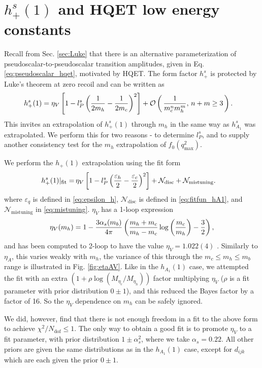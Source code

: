 \section{$h^s_+(1)$ and HQET low energy constants}

Recall from Sec. \ref{sec:Luke} that there is an alternative parameterization of pseudoscalar-to-pseudoscalar transition amplitudes, given in Eq. \eqref{eq:pseudoscalar_hqet}, motivated by HQET. The form factor $h^s_+$ is protected by Luke's theorem at zero recoil and can be written as
\begin{align}
  \label{eq:h+}
  &h^s_+(1) = \eta_V \left[ 1 - l^s_P \left( {1\over 2m_h} - {1\over 2m_c} \right)^2 \right] + \mathcal{O}\left( \, {1\over m_c^n m_h^m}, \, n+m\geq 3 \, \right).
\end{align}
This invites an extrapolation of $h^s_+(1)$ through $m_h$ in the same way as $h_{A_1}^s$ was extrapolated. We perform this for two reasons - to determine $l_P^s$, and to supply another consistency test for the $m_h$ extrapolation of $f_0(q^2_{\text{max}})$.

We perform the $h_+(1)$ extrapolation using the fit form
\begin{align}
  \label{eq:h+_fitform}
  h^s_+(1)|_{\text{fit}} =&\, \eta_V \left[ 1 - l^s_P \left( {\varepsilon_h\over2} - {\varepsilon_c\over 2} \right)^2 \right]
  + \mathcal{N}_{\text{disc}} + \mathcal{N}_{\text{mistuning}}.
\end{align}
where $\varepsilon_q$ is defined in \eqref{eq:epsilon_h}, $\mathcal{N}_{\text{disc}}$ is defined in \eqref{eq:fitfun_hA1}, and $\mathcal{N}_{\text{mistuning}}$ in \eqref{eq:mistuning}. $\eta_V$ has a 1-loop expression \cite{PASCHALIS1983473}
\begin{align}
  \eta_V(m_h) = 1 - {3 \alpha_s(m_b) \over 4\pi} \left( {m_h+m_c\over m_h-m_c} \log\left({m_c\over m_h}\right) - {3\over 2} \right),
\end{align}
and has been computed to 2-loop to have the value $\eta_V = 1.022(4)$ \cite{PhysRevLett.76.4124}. Similarly to $\eta_A$, this varies weakly with $m_h$, the variance of this through the $m_c \leq m_h \leq m_b$ range is illustrated in Fig. \ref{fig:etaAV}. Like in the $h_{A_1}(1)$ case, we attempted the fit with an extra $(1+\rho \log(M_{\eta_c}/M_{\eta_h}))$ factor multiplying $\eta_V$ ($\rho$ is a fit parameter with prior distribution $0\pm 1$), and this reduced the Bayes factor by a factor of 16. So the $\eta_V$ dependence on $m_h$ can be safely ignored.

We did, however, find that there is not enough freedom in a fit to the above form to achieve $\chi^2/N_{\text{dof}} \leq 1$. The only way to obtain a good fit is to promote $\eta_V$ to a fit parameter, with prior distribution $1\pm \alpha_s^2$, where we take $\alpha_s=0.22$. All other priors are given the same distributions as in the $h_{A_1}(1)$ case, except for $d_{ijk}$ which are each given the prior $0\pm 1$.

